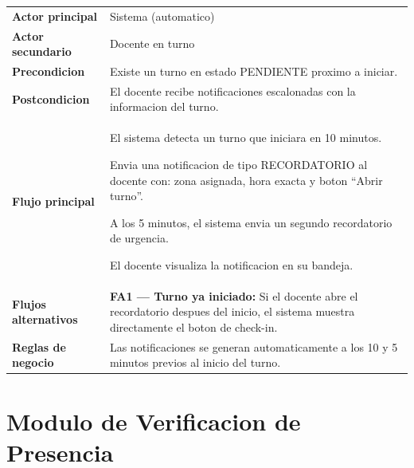 \documentclass[12pt, a4paper]{article}
\newcommand{\cu}[3]{%
  \begin{tcolorbox}[casousostyle, title={#1},
    after title={\hfill\small\normalfont\color{white!80!azulOscuro}#2}]
  \renewcommand{\arraystretch}{1.35}
  \begin{tabularx}{\linewidth}{>{\bfseries\color{azulOscuro}\small}p{3.6cm} X}
  #3
  \end{tabularx}
  \end{tcolorbox}
  \vspace{6pt}
}
\newcommand{\fcu}[2]{\small\textbf{\color{azulOscuro}#1} & \small #2 \\}
\begin{document}
\cu{CU-03 --- Recibir recordatorio de turno}{Sistema / Docente}{
  \fcu{Actor principal}{Sistema (automatico)}
  \fcu{Actor secundario}{Docente en turno}
  \fcu{Precondicion}{Existe un turno en estado PENDIENTE proximo a iniciar.}
  \fcu{Postcondicion}{El docente recibe notificaciones escalonadas con la informacion del turno.}
  \fcu{Flujo principal}{
    \begin{pasos}
      \item El sistema detecta un turno que iniciara en 10 minutos.
      \item Envia una notificacion de tipo RECORDATORIO al docente con: zona asignada, hora exacta y boton ``Abrir turno''.
      \item A los 5 minutos, el sistema envia un segundo recordatorio de urgencia.
      \item El docente visualiza la notificacion en su bandeja.
    \end{pasos}
  }
  \fcu{Flujos alternativos}{
    \textbf{FA1 --- Turno ya iniciado:} Si el docente abre el recordatorio despues del inicio, el sistema muestra directamente el boton de check-in.
  }
  \fcu{Reglas de negocio}{Las notificaciones se generan automaticamente a los 10 y 5 minutos previos al inicio del turno.}
}

\newpage

\section{Modulo de Verificacion de Presencia}
\end{document}

